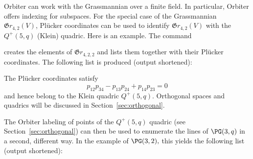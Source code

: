 Orbiter can work with the Grassmannian over a finite field. 
In particular, Orbiter offers indexing for subspaces.
For the special case of the Grassmannian ${\mathfrak Gr}_{4,2}(V)$, 
Pl\"ucker coordinates can be used to identify 
${\mathfrak Gr}_{4,2}(V)$ with the $Q^+(5,q)$ (Klein) quadric.
Here is an example. The command 
{\tt

}
creates the elements of ${\mathfrak Gr}_{4,2,2}$ 
and lists them together with their Pl\"ucker coordinates.
The following list is produced (output shortened): 
\begin{mdframed}[style=MyFrame]

\end{mdframed}
The Pl\"ucker coordinates satisfy
$$
p_{12}p_{34} - p_{13}p_{24}+p_{14}p_{23}=0
$$
and hence belong to the Klein quadric $Q^+(5,q)$.
Orthogonal spaces and quadrics will 
be discussed in Section~\ref{sec:orthogonal}.

\bigskip


The Orbiter labeling of points of 
the $Q^+(5,q)$ quadric (see Section~\ref{sec:orthogonal}) 
can then be used to enumerate the lines of $\PG(3,q)$ in a second, different way.
In the example of $\PG(3,2),$ 
this yields the following list (output shortened):
\begin{mdframed}[style=MyFrame]

\end{mdframed}


